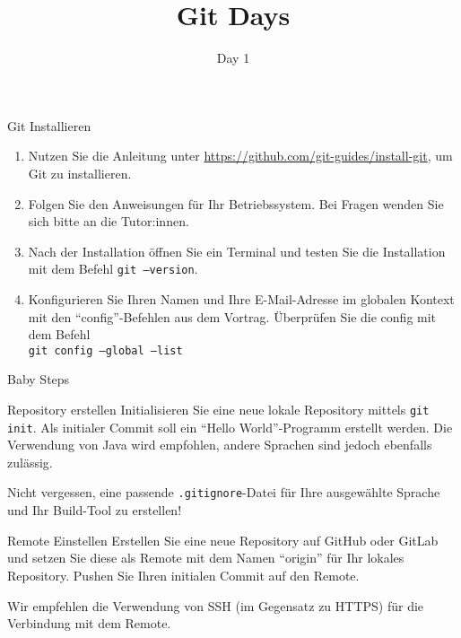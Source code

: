 \documentclass[
    english, accentcolor=TUDa-1c,
    fontsize= 12pt, a4paper, aspectratio=169, colorback=true, fancy_row_colors, boxarc=3pt,
]{algoexercise}
\title{Git Days}
\subtitle{Day 1}
\begin{document}
    \maketitle

    \begin{task}{Git Installieren}
        \begin{enumerate}
            \item Nutzen Sie die Anleitung unter \href{https://github.com/git-guides/install-git}{https://github.com/git-guides/install-git}, um Git zu installieren.
            \item Folgen Sie den Anweisungen für Ihr Betriebssystem.
                Bei Fragen wenden Sie sich bitte an die Tutor:innen.
            \item Nach der Installation öffnen Sie ein Terminal und testen Sie die Installation mit dem Befehl \texttt{git --version}.
            \item Konfigurieren Sie Ihren Namen und Ihre E-Mail-Adresse im globalen Kontext mit den \enquote{config}-Befehlen aus dem Vortrag.
                Überprüfen Sie die config mit dem Befehl\\\texttt{git config --global --list}
        \end{enumerate}
    \end{task}

    \begin{task}{Baby Steps}
        \begin{subtask*}{Repository erstellen}
            Initialisieren Sie eine neue lokale Repository mittels \texttt{git init}.
            Als initialer Commit soll ein \enquote{Hello World}-Programm erstellt werden.
            Die Verwendung von Java wird empfohlen, andere Sprachen sind jedoch ebenfalls zulässig.

            \begin{hinweis}
                Nicht vergessen, eine passende \texttt{.gitignore}-Datei für Ihre ausgewählte Sprache und Ihr Build-Tool zu erstellen!
            \end{hinweis}

        \end{subtask*}
        \begin{subtask*}{Remote Einstellen}
            Erstellen Sie eine neue Repository auf GitHub oder GitLab und setzen Sie diese als Remote mit dem Namen \enquote{origin} für Ihr
            lokales Repository.
            Pushen Sie Ihren initialen Commit auf den Remote.

            \begin{hinweis}
                Wir empfehlen die Verwendung von SSH (im Gegensatz zu HTTPS) für die Verbindung mit dem Remote.
            \end{hinweis}

        \end{subtask*}
    \end{task}
\end{document}
